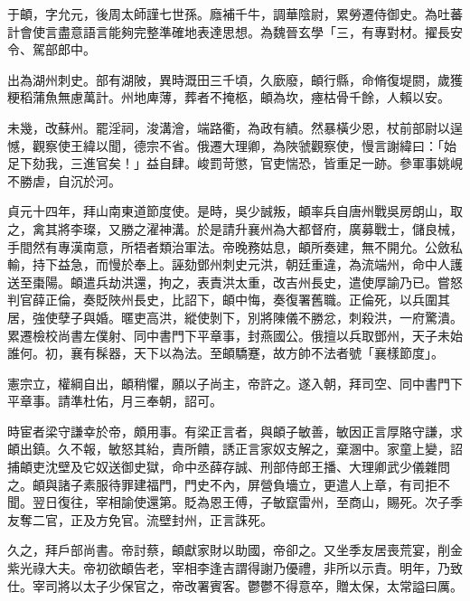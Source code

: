 
\begin{pinyinscope}

 于頔，字允元，後周太師謹七世孫。廕補千牛，調華陰尉，累勞遷侍御史。為吐蕃計會使言盡意語言能夠完整準確地表達思想。為魏晉玄學「三，有專對材。擢長安令、駕部郎中。



 出為湖州刺史。部有湖陂，異時溉田三千頃，久廞廢，頔行縣，命脩復堤閼，歲獲粳稻蒲魚無慮萬計。州地庳薄，葬者不掩柩，頔為坎，瘞枯骨千餘，人賴以安。



 未幾，改蘇州。罷淫祠，浚溝澮，端路衢，為政有績。然暴橫少恩，杖前部尉以逞憾，觀察使王緯以聞，德宗不省。俄遷大理卿，為陜虢觀察使，慢言謝緯曰：「始足下劾我，三進官矣！」益自肆。峻罰苛懲，官吏惴恐，皆重足一跡。參軍事姚峴不勝虐，自沉於河。



 貞元十四年，拜山南東道節度使。是時，吳少誠叛，頔率兵自唐州戰吳房朗山，取之，禽其將李璨，又勝之濯神溝。於是請升襄州為大都督府，廣募戰士，儲良械，手間然有專漢南意，所牾者類治軍法。帝晚務姑息，頔所奏建，無不開允。公斂私輸，持下益急，而慢於奉上。誣劾鄧州刺史元洪，朝廷重違，為流端州，命中人護送至棗陽。頔遣兵劫洪還，拘之，表責洪太重，改吉州長史，遣使厚諭乃已。嘗怒判官薛正倫，奏貶陜州長史，比詔下，頔中悔，奏復署舊職。正倫死，以兵圍其居，強使孽子與婚。暱吏高洪，縱使剝下，別將陳儀不勝忿，刺殺洪，一府驚潰。累遷檢校尚書左僕射、同中書門下平章事，封燕國公。俄擅以兵取鄧州，天子未始誰何。初，襄有髹器，天下以為法。至頔驕蹇，故方帥不法者號「襄樣節度」。



 憲宗立，權綱自出，頔稍懼，願以子尚主，帝許之。遂入朝，拜司空、同中書門下平章事。請準杜佑，月三奉朝，詔可。



 時宦者梁守謙幸於帝，頗用事。有梁正言者，與頔子敏善，敏因正言厚賂守謙，求頔出鎮。久不報，敏怒其紿，責所饋，誘正言家奴支解之，棄溷中。家童上變，詔捕頔吏沈壁及它奴送御史獄，命中丞薛存誠、刑部侍郎王播、大理卿武少儀雜問之。頔與諸子素服待罪建福門，門史不內，屏營負墻立，更遣人上章，有司拒不聞。翌日復往，宰相諭使還第。貶為恩王傅，子敏竄雷州，至商山，賜死。次子季友奪二官，正及方免官。流壁封州，正言誅死。



 久之，拜戶部尚書。帝討蔡，頔獻家財以助國，帝卻之。又坐季友居喪荒宴，削金紫光祿大夫。帝初欲頔告老，宰相李逢吉謂得謝乃優禮，非所以示責。明年，乃致仕。宰司將以太子少保官之，帝改署賓客。鬱鬱不得意卒，贈太保，太常謚曰厲。




\end{pinyinscope}
